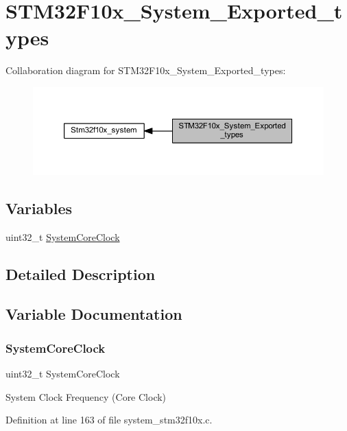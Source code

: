 \hypertarget{group___s_t_m32_f10x___system___exported__types}{}\section{S\+T\+M32\+F10x\+\_\+\+System\+\_\+\+Exported\+\_\+types}
\label{group___s_t_m32_f10x___system___exported__types}
Collaboration diagram for S\+T\+M32\+F10x\+\_\+\+System\+\_\+\+Exported\+\_\+types\+:
\nopagebreak
\begin{figure}[H]
\begin{center}
\leavevmode
\includegraphics[width=350pt]{group___s_t_m32_f10x___system___exported__types}
\end{center}
\end{figure}
\subsection*{Variables}
\begin{DoxyCompactItemize}
\item 
uint32\+\_\+t \hyperlink{group___s_t_m32_f10x___system___exported__types_gaa3cd3e43291e81e795d642b79b6088e6}{System\+Core\+Clock}
\end{DoxyCompactItemize}


\subsection{Detailed Description}


\subsection{Variable Documentation}
\mbox{\label{group___s_t_m32_f10x___system___exported__types_gaa3cd3e43291e81e795d642b79b6088e6}} 
\subsubsection{\texorpdfstring{System\+Core\+Clock}{SystemCoreClock}}
{\footnotesize\ttfamily uint32\+\_\+t System\+Core\+Clock}

System Clock Frequency (Core Clock) 

Definition at line 163 of file system\+\_\+stm32f10x.\+c.

